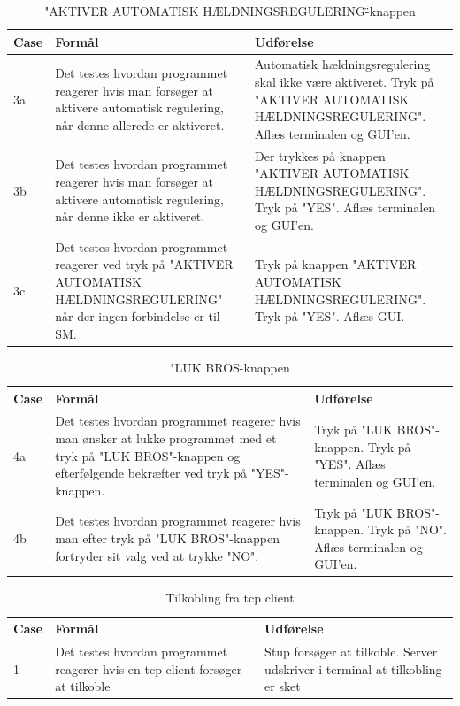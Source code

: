 \begin{table}[H]
\caption{"AKTIVER AUTOMATISK HÆLDNINGSREGULERING\"-knappen}
\centering
\begin{tabular}{| p{1cm}  | p{4.5cm} | p{8cm} |}
\hline
Case &Formål &Udførelse\\\hline
3a &Det testes hvordan programmet reagerer hvis man forsøger at aktivere automatisk regulering, når denne allerede er aktiveret. &Automatisk hældningsregulering skal ikke være aktiveret. Tryk på "AKTIVER AUTOMATISK HÆLDNINGSREGULERING". Aflæs terminalen og GUI'en.\\\hline

3b &Det testes hvordan programmet reagerer hvis man forsøger at aktivere automatisk regulering, når denne ikke er aktiveret. &Der trykkes på knappen "AKTIVER AUTOMATISK HÆLDNINGSREGULERING". Tryk på "YES". Aflæs terminalen og GUI'en.\\\hline

3c &Det testes hvordan programmet reagerer ved tryk på "AKTIVER AUTOMATISK HÆLDNINGSREGULERING" når der ingen forbindelse er til SM.&Tryk på knappen "AKTIVER AUTOMATISK HÆLDNINGSREGULERING". Tryk på "YES". Aflæs GUI.\\\hline
\end{tabular}
\end{table}

\begin{table}[H]
\caption{"LUK BROS\"-knappen}
\centering
\begin{tabular}{| p{1cm}  | p{4.5cm} | p{8cm} |}
\hline
Case &Formål &Udførelse\\\hline
4a &Det testes hvordan programmet reagerer hvis man ønsker at lukke programmet med et tryk på "LUK BROS"-knappen og efterfølgende bekræfter ved tryk på "YES"-knappen.&Tryk på "LUK BROS"-knappen. Tryk på "YES". Aflæs terminalen og GUI'en.\\\hline

4b &Det testes hvordan programmet reagerer hvis man efter tryk på "LUK BROS"-knappen fortryder sit valg ved at trykke "NO".&Tryk på "LUK BROS"-knappen. Tryk på "NO". Aflæs terminalen og GUI'en.\\\hline
\end{tabular}
\end{table}
\begin{table}[H]
\caption{Tilkobling fra tcp client}
\centering
\begin{tabular}{| p{1cm}  | p{4.5cm} | p{8cm} |}
\hline
Case &Formål &Udførelse\\\hline
1 &Det testes hvordan programmet reagerer hvis en tcp client forsøger at tilkoble &Stup forsøger at tilkoble. Server udskriver i terminal at tilkobling er sket\\\hline
\end{tabular}
\end{table}

